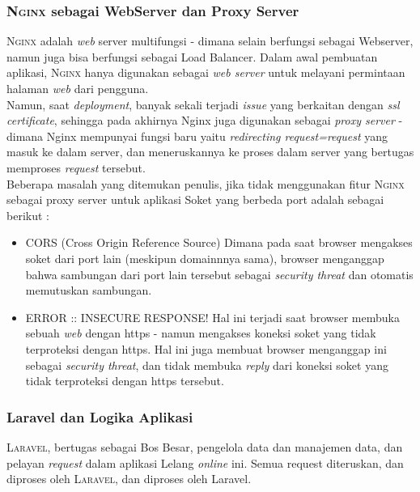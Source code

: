     \subsubsection{\textbf{\textsc{Nginx} sebagai WebServer dan Proxy Server}}
    {\scshape Nginx} adalah \textit{web} server multifungsi - dimana selain berfungsi sebagai Webserver, namun juga bisa berfungsi sebagai Load Balancer. Dalam awal pembuatan aplikasi, \textsc{Nginx} hanya digunakan sebagai \textit{web server} untuk melayani permintaan halaman \textit{web} dari pengguna.
    \\
    Namun, saat \textit{deployment}, banyak sekali terjadi \textit{issue} yang berkaitan dengan \textit{ssl certificate}, sehingga pada akhirnya Nginx juga digunakan sebagai \textit{proxy server} - dimana Nginx mempunyai fungsi baru yaitu \textit{redirecting request=request} yang masuk ke dalam server, dan meneruskannya ke proses dalam server yang bertugas memproses \textit{request} tersebut.
	   \\
    Beberapa masalah yang ditemukan penulis, jika tidak menggunakan fitur \textsc{Nginx} sebagai proxy server untuk aplikasi Soket yang berbeda port adalah sebagai berikut :
	    \begin{itemize}[noitemsep,topsep=0pt]
	    \item CORS (Cross Origin Reference Source)
	    \newline
	    Dimana pada saat browser mengakses soket dari port lain (meskipun domainnnya sama), browser menganggap bahwa sambungan dari port lain tersebut sebagai \textit{security threat} dan otomatis memutuskan sambungan.
	    \item ERROR :: INSECURE RESPONSE!
	    \newline
	    Hal ini terjadi saat browser membuka sebuah \textit{web} dengan https - namun mengakses koneksi soket yang tidak terproteksi dengan https. Hal ini juga membuat browser menganggap ini sebagai \textit{security threat}, dan tidak membuka \textit{reply} dari koneksi soket yang tidak terproteksi dengan https tersebut.
	    \end{itemize}
    
    \subsubsection {\textbf{Laravel dan Logika Aplikasi}}
    \textsc{Laravel}, bertugas sebagai Bos Besar, pengelola data dan manajemen data, dan pelayan \textit{request} dalam aplikasi Lelang \textit{online} ini. Semua request diteruskan, dan diproses oleh \textsc{Laravel}, dan diproses oleh Laravel. 	    
    
